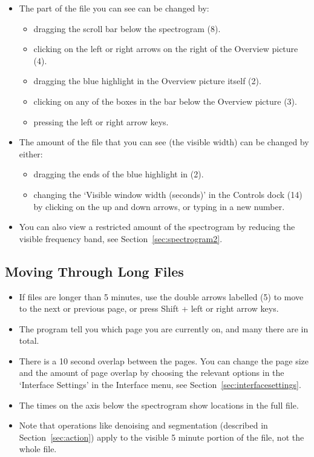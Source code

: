 \documentclass{article}
\begin{document}
\begin{itemize}
\item The part of the file you can see can be changed by:
	\begin{itemize}
	\item dragging the scroll bar below the spectrogram (8).
	\item clicking on the left or right arrows on the right of the Overview picture (4).
	\item dragging the blue highlight in the Overview picture itself (2). 
	\item clicking on any of the boxes in the bar below the Overview picture (3).
	\item pressing the left or right arrow keys.
	\end{itemize}
	
\item The amount of the file that you can see (the visible width) can be changed by either: 
	\begin{itemize}
	\item dragging the ends of the blue highlight in (2).
	\item changing the `Visible window width (seconds)' in the Controls dock (14) by clicking on the up and down arrows, or typing in a new number.
	\end{itemize}

\item You can also view a restricted amount of the spectrogram by reducing the visible frequency band, see Section~\ref{sec:spectrogram2}. 
\end{itemize}

\subsection{Moving Through Long Files}

\begin{itemize}
\item If files are longer than 5 minutes, use the double arrows labelled (5) to move to the next or previous page, or press Shift + left or right arrow keys. 
\item The program tell you which page you are currently on, and many there are in total. 
\item There is a 10 second overlap between the pages. You can change the page size and the amount of page overlap by choosing the relevant options in the `Interface Settings' in the Interface menu, see Section~\ref{sec:interfacesettings}. 
\item The times on the axis below the spectrogram show locations in the full file.
\item Note that operations like denoising and segmentation (described in Section~\ref{sec:action}) apply to the visible 5 minute portion of the file, not the whole file.
\end{itemize}
\end{document}
